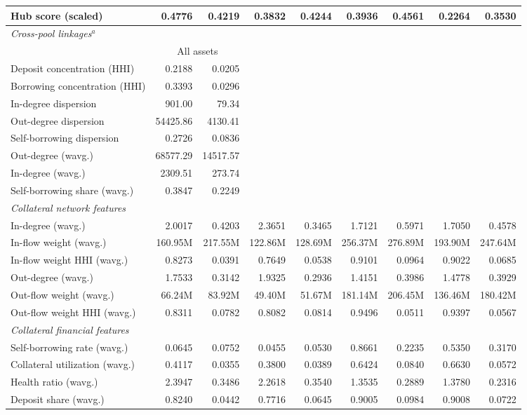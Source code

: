 \documentclass[a4paper,UKenglish,cleveref, autoref, thm-restate]{informs3}
\begin{document}
\begin{table}[H]
\begin{threeparttable}
\begin{tabular}{lrrrrrrrr}
Hub score (scaled) & 0.4776 & 0.4219 & 0.3832 & 0.4244 & 0.3936 & 0.4561 & 0.2264 & 0.3530 \\
\midrule
\multicolumn{9}{l}{\textit{Cross-pool linkages}$^{a}$} \\
\cmidrule(lr){2-3}
\multicolumn{1}{l}{} & \multicolumn{2}{c}{All assets} & \multicolumn{6}{c}{} \\
\cmidrule(lr){2-3}
Deposit concentration (HHI) & 0.2188 & 0.0205 & \multicolumn{6}{c}{} \\
Borrowing concentration (HHI) & 0.3393 & 0.0296 & \multicolumn{6}{c}{} \\
In-degree dispersion & 901.00 & 79.34 & \multicolumn{6}{c}{} \\
Out-degree dispersion & 54425.86 & 4130.41 & \multicolumn{6}{c}{} \\
Self-borrowing dispersion & 0.2726 & 0.0836 & \multicolumn{6}{c}{} \\
Out-degree (wavg.) & 68577.29 & 14517.57 & \multicolumn{6}{c}{} \\
In-degree (wavg.) & 2309.51 & 273.74 & \multicolumn{6}{c}{} \\
Self-borrowing share (wavg.) & 0.3847 & 0.2249 & \multicolumn{6}{c}{} \\
\midrule
\multicolumn{9}{l}{\textit{Collateral network features}} \\
In-degree (wavg.) & 2.0017 & 0.4203 & 2.3651 & 0.3465 & 1.7121 & 0.5971 & 1.7050 & 0.4578 \\
In-flow weight (wavg.) & 160.95M & 217.55M & 122.86M & 128.69M & 256.37M & 276.89M & 193.90M & 247.64M \\
In-flow weight HHI (wavg.) & 0.8273 & 0.0391 & 0.7649 & 0.0538 & 0.9101 & 0.0964 & 0.9022 & 0.0685 \\
Out-degree (wavg.) & 1.7533 & 0.3142 & 1.9325 & 0.2936 & 1.4151 & 0.3986 & 1.4778 & 0.3929 \\
Out-flow weight (wavg.) & 66.24M & 83.92M & 49.40M & 51.67M & 181.14M & 206.45M & 136.46M & 180.42M \\
Out-flow weight HHI (wavg.) & 0.8311 & 0.0782 & 0.8082 & 0.0814 & 0.9496 & 0.0511 & 0.9397 & 0.0567 \\
\midrule
\multicolumn{9}{l}{\textit{Collateral financial features}} \\
Self-borrowing rate (wavg.) & 0.0645 & 0.0752 & 0.0455 & 0.0530 & 0.8661 & 0.2235 & 0.5350 & 0.3170 \\
Collateral utilization (wavg.) & 0.4117 & 0.0355 & 0.3800 & 0.0389 & 0.6424 & 0.0840 & 0.6630 & 0.0572 \\
Health ratio (wavg.) & 2.3947 & 0.3486 & 2.2618 & 0.3540 & 1.3535 & 0.2889 & 1.3780 & 0.2316 \\
Deposit share (wavg.) & 0.8240 & 0.0442 & 0.7716 & 0.0645 & 0.9005 & 0.0984 & 0.9008 & 0.0722 \\
\bottomrule
\end{tabular}

\end{threeparttable}
\end{table}
\end{document}
